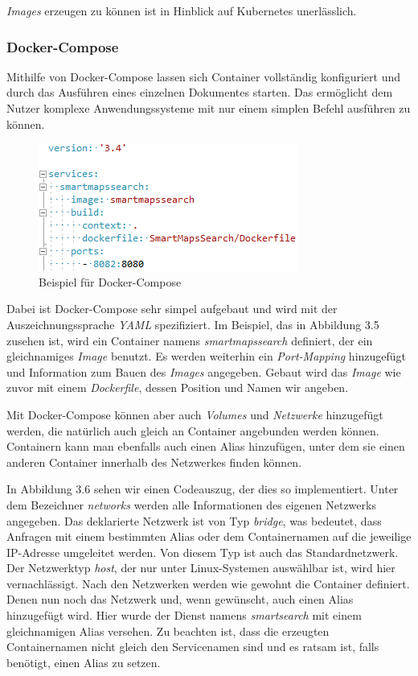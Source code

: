\documentclass[12pt,a4paper]{scrartcl}
\begin{document}
\emph{Images} erzeugen zu können ist in Hinblick auf Kubernetes unerlässlich.

\subsubsection{Docker-Compose}

Mithilfe von Docker-Compose lassen sich Container vollständig konfiguriert und durch das Ausführen eines einzelnen Dokumentes starten. Das ermöglicht dem Nutzer komplexe Anwendungssysteme mit nur einem simplen Befehl ausführen zu können. 

\begin{figure}[h!]
	\centering
	\includegraphics[scale=1]{DockerComposeMin.png}
	\caption[Screenshot]{Beispiel für Docker-Compose}
\end{figure}

Dabei ist Docker-Compose sehr simpel aufgebaut und wird mit der Auszeichnungssprache \emph{YAML} spezifiziert. Im Beispiel, das in Abbildung 3.5 zusehen ist, wird ein Container namens \emph{smartmapssearch} definiert, der ein gleichnamiges \emph{Image} benutzt. Es werden weiterhin ein \emph{Port-Mapping} hinzugefügt und Information zum Bauen des \emph{Images} angegeben. Gebaut wird das \emph{Image} wie zuvor mit einem \emph{Dockerfile}, dessen Position und Namen wir angeben. 

Mit Docker-Compose können aber auch \emph{Volumes} und \emph{Netzwerke} hinzugefügt werden, die natürlich auch gleich an Container angebunden werden können.
Containern kann man ebenfalls auch einen Alias hinzufügen, unter dem sie einen anderen Container innerhalb des Netzwerkes finden können. 

In Abbildung 3.6 sehen wir einen Codeauszug, der dies so implementiert. Unter dem Bezeichner \emph{networks} werden alle Informationen des eigenen Netzwerks angegeben. Das deklarierte Netzwerk ist von Typ \emph{bridge}, was bedeutet, dass Anfragen mit einem bestimmten Alias oder dem Containernamen auf die jeweilige IP-Adresse umgeleitet werden. Von diesem Typ ist auch das Standardnetzwerk. Der Netzwerktyp \emph{host}, der nur unter Linux-Systemen auswählbar ist, wird hier vernachlässigt. Nach den Netzwerken werden wie gewohnt die Container definiert. Denen nun noch das Netzwerk und, wenn gewünscht, auch einen Alias hinzugefügt wird. Hier wurde der Dienst namens \emph{smartsearch} mit einem gleichnamigen Alias versehen. Zu beachten ist, dass die erzeugten Containernamen nicht gleich den Servicenamen sind und es ratsam ist, falls benötigt, einen Alias zu setzen.
\end{document}
